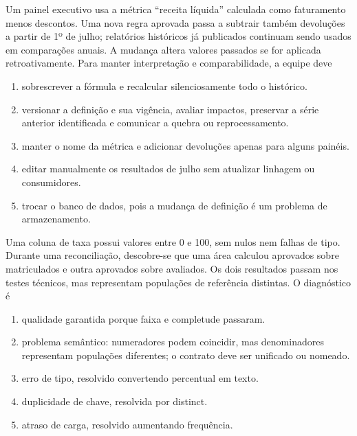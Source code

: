 \TextoBase Um painel executivo usa a métrica ``receita líquida'' calculada como faturamento menos descontos. Uma nova regra aprovada passa a subtrair também devoluções a partir de 1º de julho; relatórios históricos já publicados continuam sendo usados em comparações anuais. A mudança altera valores passados se for aplicada retroativamente.
\FonteDidatica
\Comando Para manter interpretação e comparabilidade, a equipe deve
\begin{enumerate}[label=\Alph*)]
\item sobrescrever a fórmula e recalcular silenciosamente todo o histórico.
\item versionar a definição e sua vigência, avaliar impactos, preservar a série anterior identificada e comunicar a quebra ou reprocessamento.
\item manter o nome da métrica e adicionar devoluções apenas para alguns painéis.
\item editar manualmente os resultados de julho sem atualizar linhagem ou consumidores.
\item trocar o banco de dados, pois a mudança de definição é um problema de armazenamento.
\end{enumerate}
\TextoBase Uma coluna de taxa possui valores entre 0 e 100, sem nulos nem falhas de tipo. Durante uma reconciliação, descobre-se que uma área calculou aprovados sobre matriculados e outra aprovados sobre avaliados. Os dois resultados passam nos testes técnicos, mas representam populações de referência distintas.
\FonteDidatica
\Comando O diagnóstico é
\begin{enumerate}[label=\Alph*)]\item qualidade garantida porque faixa e completude passaram.\item problema semântico: numeradores podem coincidir, mas denominadores representam populações diferentes; o contrato deve ser unificado ou nomeado.\item erro de tipo, resolvido convertendo percentual em texto.\item duplicidade de chave, resolvida por distinct.\item atraso de carga, resolvido aumentando frequência.
\end{enumerate}

